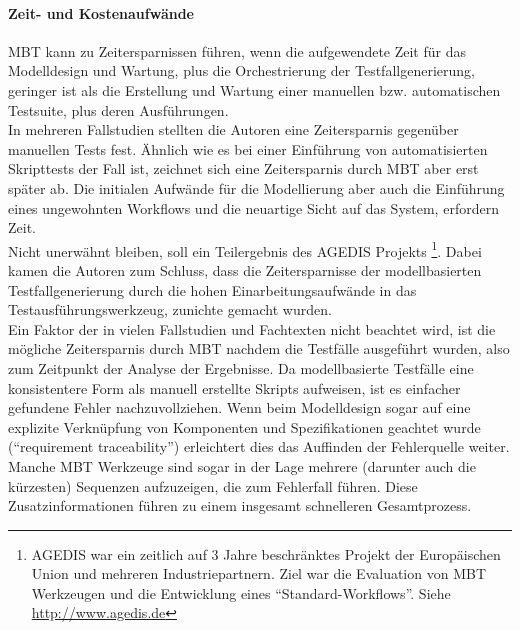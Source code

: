 \paragraph{Zeit- und Kostenaufwände} MBT kann zu Zeitersparnissen führen, wenn die aufgewendete Zeit für das Modelldesign und Wartung, plus die Orchestrierung der Testfallgenerierung, geringer ist als die Erstellung und Wartung einer manuellen bzw. automatischen Testsuite, plus deren Ausführungen.\\
In mehreren Fallstudien stellten die Autoren eine Zeitersparnis gegenüber manuellen Tests fest\cite{farchi_using_2002}\cite{prenninger_mbt_2005}\cite{pretschner_one_2005}. Ähnlich wie es bei einer Einführung von automatisierten Skripttests der Fall ist, zeichnet sich eine Zeitersparnis durch MBT aber erst später ab. Die initialen Aufwände für die Modellierung aber auch die Einführung eines ungewohnten Workflows und die neuartige Sicht auf das System, erfordern Zeit.\\
Nicht unerwähnt bleiben, soll ein Teilergebnis des AGEDIS Projekts \footnote{AGEDIS war ein zeitlich auf 3 Jahre beschränktes Projekt der Europäischen Union und mehreren Industriepartnern. Ziel war die Evaluation von MBT Werkzeugen und die Entwicklung eines ``Standard-Workflows''. Siehe \url{http://www.agedis.de}}. Dabei kamen die Autoren zum Schluss, dass die Zeitersparnisse der modellbasierten Testfallgenerierung durch die hohen Einarbeitungsaufwände in das Testausführungswerkzeug, zunichte gemacht wurden\cite{craggs_agedis_2003}.\\
Ein Faktor der in vielen Fallstudien und Fachtexten nicht beachtet wird, ist die mögliche Zeitersparnis durch MBT nachdem die Testfälle ausgeführt wurden, also zum Zeitpunkt der Analyse der Ergebnisse. Da modellbasierte Testfälle eine konsistentere Form als manuell erstellte Skripts aufweisen, ist es einfacher gefundene Fehler nachzuvollziehen. Wenn beim Modelldesign sogar auf eine explizite Verknüpfung von Komponenten und Spezifikationen geachtet wurde (``requirement traceability'') erleichtert dies das Auffinden der Fehlerquelle weiter. Manche MBT Werkzeuge sind sogar in der Lage mehrere (darunter auch die kürzesten) Sequenzen aufzuzeigen, die zum Fehlerfall führen. Diese Zusatzinformationen führen zu einem insgesamt schnelleren Gesamtprozess\cite{utting_practical_2007}.

